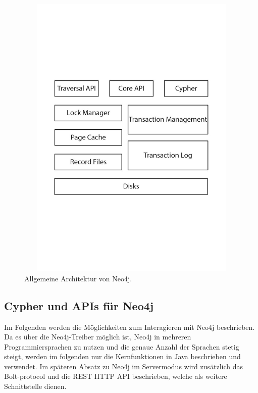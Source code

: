 \begin{figure}[th]
	\centering
	\includegraphics [width=13cm, height=14cm]{Figures/Architecure}
	\caption[Architecture]{Allgemeine Architektur von Neo4j.}
	\label{fig:Architecure}
\end{figure}

\subsection{Cypher und APIs für Neo4j}
Im Folgenden werden die Möglichkeiten zum Interagieren mit Neo4j beschrieben. Da es über die Neo4j-Treiber möglich ist, Neo4j in mehreren Programmiersprachen zu nutzen und die genaue Anzahl der Sprachen stetig steigt, werden im folgenden nur die Kernfunktionen in Java beschrieben und verwendet. Im späteren Absatz zu Neo4j im Servermodus wird zusätzlich das Bolt-protocol und die REST HTTP API beschrieben, welche als weitere Schnittstelle dienen.

